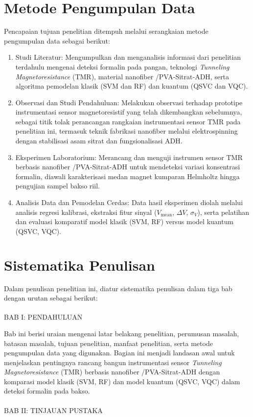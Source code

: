 \section{Metode Pengumpulan Data}
Pencapaian tujuan penelitian ditempuh melalui serangkaian metode pengumpulan data sebagai berikut:
\begin{enumerate}
    \item Studi Literatur: Mengumpulkan dan menganalisis informasi dari penelitian terdahulu mengenai deteksi formalin pada pangan, teknologi \textit{Tunneling Magnetoresistance} (TMR), material nanofiber /PVA-Sitrat-ADH, serta algoritma pemodelan klasik (SVM dan RF) dan kuantum (QSVC dan VQC).
    \item Observasi dan Studi Pendahuluan: Melakukan observasi terhadap prototipe instrumentasi sensor magnetoresistif yang telah dikembangkan sebelumnya, sebagai titik tolak perancangan rangkaian instrumentasi sensor TMR pada penelitian ini, termasuk teknik fabrikasi nanofiber melalui elektrospinning dengan stabilisasi asam sitrat dan fungsionalisasi ADH.
    \item Eksperimen Laboratorium: Merancang dan menguji instrumen sensor TMR berbasis nanofiber /PVA-Sitrat-ADH untuk mendeteksi variasi konsentrasi formalin, diawali karakterisasi medan magnet kumparan Helmholtz hingga pengujian sampel bakso riil.
    \item Analisis Data dan Pemodelan Cerdas: Data hasil eksperimen diolah melalui analisis regresi kalibrasi, ekstraksi fitur sinyal ($V_{\text{mean}}$, $\Delta V$, $\sigma_V$), serta pelatihan dan evaluasi komparatif model klasik (SVM, RF) versus model kuantum (QSVC, VQC).
\end{enumerate}

\newpage
\section{Sistematika Penulisan}
Dalam penulisan penelitian ini, diatur sistematika penulisan dalam tiga bab dengan urutan sebagai berikut:
\\
\\
BAB I: PENDAHULUAN

Bab ini berisi uraian mengenai latar belakang penelitian, perumusan masalah, batasan masalah, tujuan penelitian, manfaat penelitian, serta metode pengumpulan data yang digunakan. Bagian ini menjadi landasan awal untuk menjelaskan pentingnya rancang bangun instrumentasi sensor \textit{Tunneling Magnetoresistance} (TMR) berbasis nanofiber /PVA-Sitrat-ADH dengan komparasi model klasik (SVM, RF) dan model kuantum (QSVC, VQC) dalam deteksi formalin pada bakso.
\\
\\
BAB II: TINJAUAN PUSTAKA

